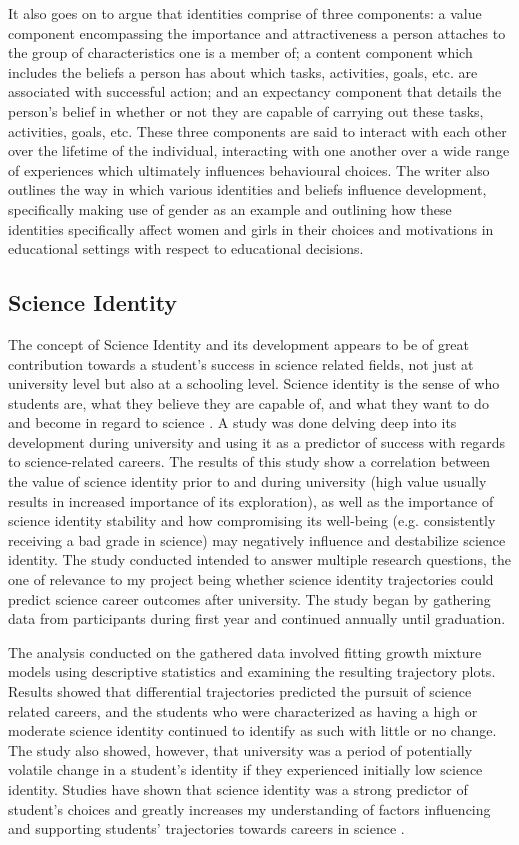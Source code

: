 \documentclass[conference]{IEEEtran}
\begin{document}
It also goes on to argue that identities comprise of three components: a value component encompassing the importance and attractiveness a person attaches to the group of characteristics one is a member of; a content component which includes the beliefs a person has about which tasks, activities, goals, etc. are associated with successful action; and an expectancy component that details the person's belief in whether or not they are capable of carrying out these tasks, activities, goals, etc. These three components are said to interact with each other over the lifetime of the individual, interacting with one another over a wide range of experiences which ultimately influences behavioural choices. The writer also outlines the way in which various identities and beliefs influence development, specifically making use of gender as an example and outlining how these identities specifically affect women and girls in their choices and motivations in educational settings with respect to educational decisions.

\subsection{Science Identity}

The concept of Science Identity and its development appears to be of great contribution towards a student's success in science related fields, not just at university level but also at a schooling level. Science identity is the sense of who students are, what they believe they are capable of, and what they want to do and become in regard to science \cite{b5} . A study was done \cite{b6} delving deep into its development during university and using it as a predictor of success with regards to science-related careers. The results of this study show a correlation between the value of science identity prior to and during university (high value usually results in increased importance of its exploration), as well as the importance of science identity stability and how compromising its well-being (e.g. consistently receiving a bad grade in science) may negatively influence and destabilize science identity. The study conducted intended to answer multiple research questions, the one of relevance to my project being whether science identity trajectories could predict science career outcomes after university. The study began by gathering data from participants during first year and continued annually until graduation.

The analysis conducted on the gathered data involved fitting growth mixture models using descriptive statistics and examining the resulting trajectory plots. Results showed that differential trajectories predicted the pursuit of science related careers, and the students who were characterized as having a high or moderate science identity continued to identify as such with little or no change. The study also showed, however, that university was a period of potentially volatile change in a student's identity if they experienced initially low science identity. Studies have shown that science identity was a strong predictor of student’s choices and greatly increases my understanding of factors influencing and supporting students’ trajectories towards careers in science \cite{b7}.
\end{document}
